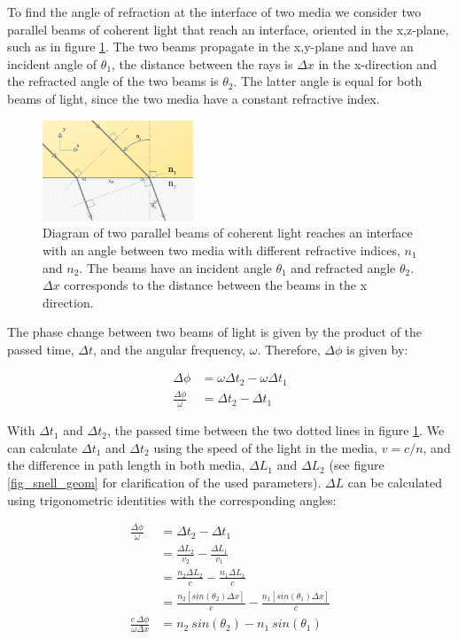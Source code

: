 \documentclass{article}
\begin{document}
To find the angle of refraction at the interface of two media we consider two parallel beams of coherent light that reach an interface, oriented in the x,z-plane, such as in figure \ref{fig_snell_geom_empty}. The two beams propagate in the x,y-plane and have an incident angle of $\theta_1$, the distance between the rays is $\Delta x$ in the x-direction and the refracted angle of the two beams is $\theta _2$. The latter angle is equal for both beams of light, since the two media have a constant refractive index. \\

\begin{figure}[h!]
	\centering
	\includegraphics[width=0.4\textwidth]{afbeeldingen/snell_geom_empty.jpg}
	\caption{Diagram of two parallel beams of coherent light reaches an interface  with an angle between two media with different refractive indices, $n_1$ and $n_2$. The beams have an incident angle $ \theta_1$ and refracted angle $\theta_2$. $\Delta x$ corresponds to the distance between the beams in the x direction. }
	\label{fig_snell_geom_empty}
\end{figure}

The phase change between two beams of light is given by the product of the passed time, $\Delta t$, and the angular frequency, $\omega$. Therefore, $\Delta \phi$ is given by:

\begin{align*}
	\Delta \phi &= \omega \Delta t_2 - \omega \Delta t_1 \\
	\frac{\Delta \phi}{\omega} &= \Delta t_2 - \Delta t_1
\end{align*}

With $\Delta t_1$ and $\Delta t_2$, the passed time between the two dotted lines in figure \ref{fig_snell_geom_empty}. 
We can calculate $\Delta t_1$ and $\Delta t_2$ using the speed of the light in the media, $v = c/n$, and the difference in path length in both media, $\Delta L_1$ and $\Delta L_2$ (see figure \ref{fig_snell_geom} for clarification of the used parameters). $\Delta L$ can be calculated using trigonometric identities with the corresponding angles:

\begin{align*}
	\frac{\Delta \phi}{\omega} &= \Delta t_2 - \Delta t_1 \\
	&= \frac{\Delta L_2}{v_2} - \frac{\Delta L_1}{v_1} \\
	&= \frac{n_2 \Delta L_2}{c} - \frac{n_1 \Delta L_1}{c} \\
	&= \frac{n_2 [sin(\theta_2) \Delta x]}{c} - \frac{n_1 [sin(\theta_1) \Delta x]}{c} \\
	\frac{c \: \Delta \phi}{\omega \Delta x} &=  n_2 \: sin(\theta_2) - n_1 \: sin(\theta_1)   \\
\end{align*}
\end{document}
